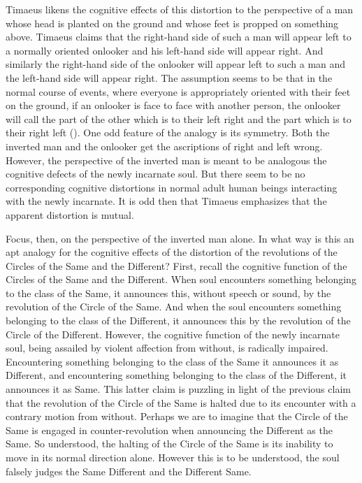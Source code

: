 Timaeus likens the cognitive effects of this distortion to the perspective of a man whose head is planted on the ground and whose feet is propped on something above. Timaeus claims that the right-hand side of such a man will appear left to a normally oriented onlooker and his left-hand side will appear right. And similarly the right-hand side of the onlooker will appear left to such a man and the left-hand side will appear right. The assumption seems to be that in the normal course of events, where everyone is appropriately oriented with their feet on the ground, if an onlooker is face to face with another person, the onlooker will call the part of the other which is to their left right and the part which is to their right left (\citealt[271]{Taylor:1928qb}). One odd feature of the analogy is its symmetry. Both the inverted man and the onlooker get the ascriptions of right and left wrong. However, the perspective of the inverted man is meant to be analogous the cognitive defects of the newly incarnate soul. But there seem to be no corresponding cognitive distortions in normal adult human beings interacting with the newly incarnate. It is odd then that Timaeus emphasizes that the apparent distortion is mutual.

Focus, then, on the perspective of the inverted man alone. In what way is this an apt analogy for the cognitive effects of the distortion of the revolutions of the Circles of the Same and the Different? First, recall the cognitive function of the Circles of the Same and the Different. When soul encounters something belonging to the class of the Same, it announces this, without speech or sound, by the revolution of the Circle of the Same. And when the soul encounters something belonging to the class of the Different, it announces this by the revolution of the Circle of the Different. However, the cognitive function of the newly incarnate soul, being assailed by violent affection from without, is radically impaired. Encountering something belonging to the class of the Same it announces it as Different, and encountering something belonging to the class of the Different, it announces it as Same. This latter claim is puzzling in light of the previous claim that the revolution of the Circle of the Same is halted due to its encounter with a contrary motion from without. Perhaps we are to imagine that the Circle of the Same is engaged in counter-revolution when announcing the Different as the Same. So understood, the halting of the Circle of the Same is its inability to move in its normal direction alone. However this is to be understood, the soul falsely judges the Same Different and the Different Same. 

